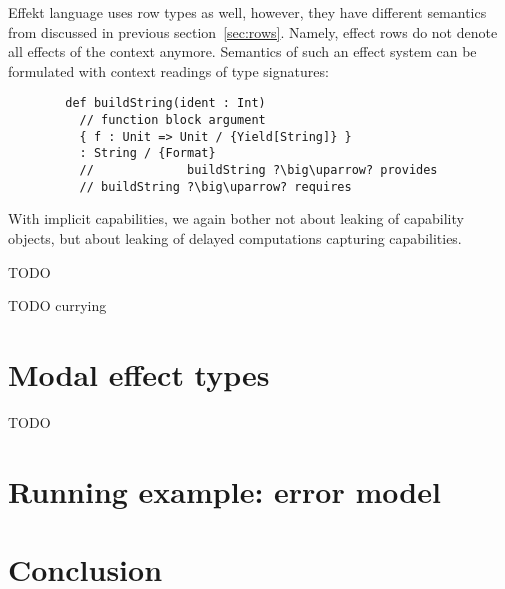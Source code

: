 \documentclass[conference]{IEEEtran}
\begin{document}
    Effekt language uses row types as well, however, they have different semantics from discussed in previous section~\ref{sec:rows}.
    Namely, effect rows do not denote all effects of the context anymore.
    Semantics of such an effect system can be formulated with context readings of type signatures:
    \begin{verbatim}
        def buildString(ident : Int)
          // function block argument
          { f : Unit => Unit / {Yield[String]} }
          : String / {Format}
          //             buildString ?\big\uparrow? provides
          // buildString ?\big\uparrow? requires
    \end{verbatim}

    With implicit capabilities, we again bother not about leaking of capability objects, but about leaking of delayed computations capturing capabilities.


    TODO \cite{brachthauser2022effects}


    TODO currying %



    \section{Modal effect types} \label{sec:modal}

    TODO \cite{convent2020doo}\cite{tang2024modal}



    \section{Running example: error model}



    \section{Conclusion}



%



    
    
\end{document}
